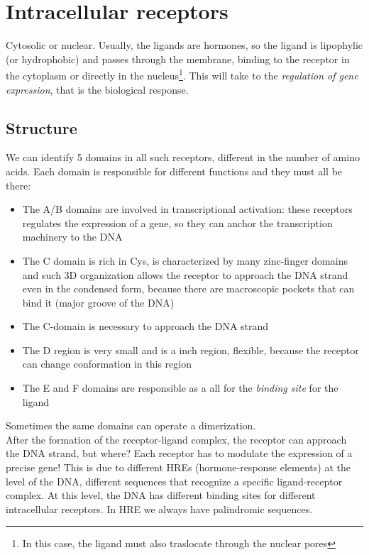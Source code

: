 \documentclass[a4paper, 12pt]{book}
\begin{document}
\section{Intracellular receptors}
Cytosolic or nuclear. Usually, the ligands are hormones, so the ligand is lipophylic (or hydrophobic) and passes through the membrane, binding to the receptor in the cytoplasm or directly in the nucleus\footnote{In this case, the ligand must also traslocate through the nuclear pores}. This will take to the \emph{regulation of gene expression}, that is the biological response.

\subsection{Structure}
We can identify 5 domains in all such receptors, different in the number of amino acids. Each domain is responsible for different functions and they must all be there:
\begin{itemize}
\item{The A/B domains are involved in transcriptional activation: these receptors regulates the expression of a gene, so they can anchor the transcription machinery to the DNA}
\item{The C domain is rich in Cys, is characterized by many zinc-finger domains and such 3D organization allows the receptor to approach the DNA strand even in the condensed form, because there are macroscopic pockets that can bind it (major groove of the DNA)}
\item{The C-domain is necessary to approach the DNA strand}
\item{The D region is very small and is a inch region, flexible, because the receptor can change conformation in this region}
\item{The E and F domains are responsible as a all for the \emph{binding site} for the ligand}
\end{itemize}

Sometimes the same domains can operate a dimerization.
\\

After the formation of the receptor-ligand complex, the receptor can approach the DNA strand, but where? Each receptor has to modulate the expression of a precise gene! This is due to different HREs  (hormone-response elements) at the level of the DNA, different sequences that  recognize a specific  ligand-receptor complex. At this level, the DNA has different binding sites for different intracellular receptors. In HRE we always have palindromic sequences.
\end{document}
